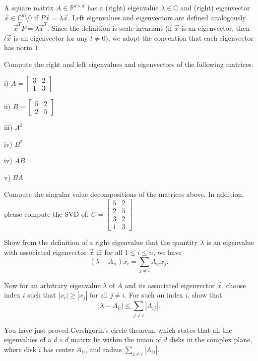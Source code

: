 \documentclass[11pt]{article}
\begin{document}
A square matrix $A \in \mathbb{R}^{d \times d}$ has a (right) eigenvalue $\lambda \in \mathbb{C}$ and (right) eigenvector $\vec{x} \in \mathbb{C}^{d} \setminus 0$ if
$P\vec{x} = \lambda \vec{x}$. Left eigenvalues and eigenvectors are
defined analogously --- $\vec{x}^T P = \lambda \vec{x}^T$. Since the definition is scale invariant (if $\vec{x}$ is an eigenvector, then $t\vec{x}$ is an eigenvector for any $t \neq 0$), we adopt the convention that each eigenvector has norm $1$.

\begin{Parts}

\Part Compute the right and left eigenvalues and eigenvectors of the following matrices.

i) $A =
\begin{bmatrix}
3 & 2 \\
1 & 3
\end{bmatrix}
$



ii) $B =
\begin{bmatrix}
5 & 2 \\
2 & 5
\end{bmatrix}
$




iii) $A^2$




iv) $B^2$




iv) $AB$





v) $BA$




\Part Compute the singular value decompositions of the matrices
above. In addition, please compute the SVD of: 
$C =
\begin{bmatrix}
5 & 2 \\
2 & 5 \\
3 & 2 \\
1 & 3
\end{bmatrix}
$




\Part Show from the definition of a right eigenvalue that the quantity
$\lambda$ is an eigenvalue with associated eigenvector $\vec{x}$ iff
for all $1 \leq i \leq n$, we have $$(\lambda - A_{ii}) x_i = \sum_{j
  \neq i} A_{ij} x_j.$$ 




\Part Now for an arbitrary eigenvalue $\lambda$ of $A$ and its
associated eigenvector $\vec{x}$, choose index $i$ such that $|x_i|
\geq |x_j|$ for all $j \neq i$. For such an index $i$, show that 
$$|\lambda - A_{ii}| \leq \sum_{j \neq i} |A_{ij}|.$$

You have just proved Gershgorin's circle theorem, which states that
all the eigenvalues of a $d \times d$ matrix lie within the union of
$d$ disks in the complex plane, where disk $i$ has center $A_{ii}$,
and radius $\sum_{j \neq i} |A_{ij}|$.




\end{Parts}
\end{document}
